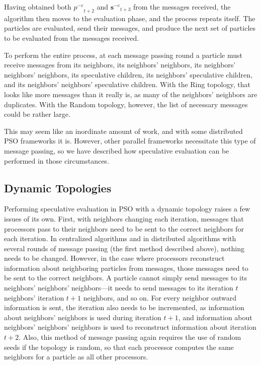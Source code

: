 \documentclass[letterpaper]{sig-alt-release2}
\providecommand{\noeval}[1]{\ensuremath{#1^{-e}}}
\providecommand{\p}{\ensuremath{p}}
\providecommand{\sset}{\ensuremath{\mathbf{s}}}
\begin{document}
Having obtained both $\noeval{\p}_{t+2}$ and $\noeval{\sset}_{t+3}$ from the
messages received, the algorithm then moves to the evaluation phase, and the
process repeats itself.  The particles are evaluated, send their messages, and
produce the next set of particles to be evaluated from the messages received.

To perform the entire process, at each message passing round a particle must
receive messages from its neighbors, its neighbors' neighbors, its neighbors'
neighbors' neighbors, its speculative children, its neighbors' speculative
children, and its neighbors' neighbors' speculative children.  With the Ring
topology, that looks like more messages than it really is, as many of the
neighbors' neighbors are duplicates.  With the Random topology, however, the
list of necessary messages could be rather large.  

This may seem like an inordinate amount of work, and with some distributed PSO
frameworks it is.  However, other parallel frameworks necessitate this type of
message passing, so we have described how speculative evaluation can be
performed in those circumstances.

\subsection{Dynamic Topologies}

Performing speculative evaluation in PSO with a dynamic topology raises a few
issues of its own.  First, with neighbors changing each iteration, messages
that processors pass to their neighbors need to be sent to the correct
neighbors for each iteration.  In centralized algorithms and in distributed
algorithms with several rounds of message passing (the first method described
above), nothing needs to be changed.  However, in the case where processors
reconstruct information about neighboring particles from messages, those
messages need to be sent to the correct neighbors.  A particle cannot simply
send messages to its neighbors' neighbors' neighbors---it needs to send
messages to its iteration $t$ neighbors' iteration $t+1$ neighbors, and so on.
For every neighbor outward information is sent, the iteration also needs to be
incremented, as information about neighbors' neighbors is used during iteration
$t+1$, and information about neighbors' neighbors' neighbors is used to
reconstruct information about iteration $t+2$.  Also, this method of message
passing again requires the use of random seeds if the topology is random, so
that each processor computes the same neighbors for a particle as all other
processors.
\end{document}
